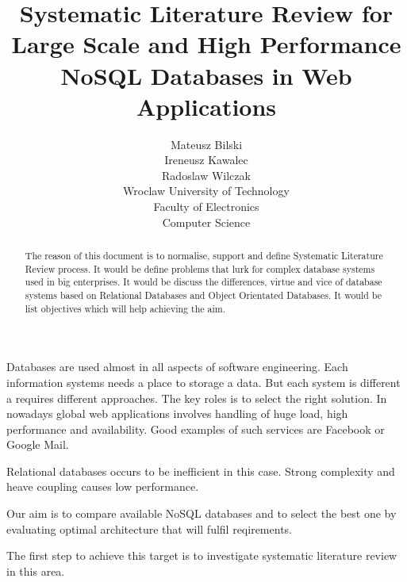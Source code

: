 \documentclass[times, 10pt,twocolumn]{article}
\begin{document}
\title{ Systematic Literature Review
       for Large Scale and High Performance NoSQL Databases in Web Applications}

\author{Mateusz Bilski\\ Ireneusz Kawalec \\ Radoslaw Wilczak\\
Wroclaw University of Technology\\ Faculty of Electronics \\ Computer Science
}

\maketitle
\thispagestyle{empty}

\begin{abstract}

The reason of this document is to normalise, support and define Systematic Literature Review process. 
It would be define problems that lurk for complex database systems used in big enterprises. 
It would be discuss the differences, virtue and vice of database systems based on Relational Databases and Object Orientated Databases.
It would be list objectives which will help achieving the aim.

\end{abstract}




Databases are used almost in all aspects of software engineering. 
Each information systems needs a place to storage a data. But each system is different
a requires different approaches. The key roles is to select the right solution.
In nowadays global web applications involves handling of huge load, high performance and availability. Good examples of such services are Facebook or Google Mail.

Relational databases occurs to be inefficient in this case. Strong complexity and heave coupling causes low performance.




Our aim is to compare available NoSQL databases and to select the best one by evaluating 
optimal architecture that will fulfil reqirements. 

The first step to achieve this target is to investigate systematic literature review in this area. 
\end{document}
